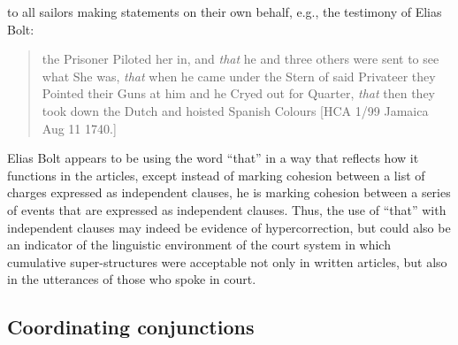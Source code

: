 to all sailors making statements on their own behalf, e.g., the testimony of Elias Bolt:

\begin{quotation}
the Prisoner Piloted her in, and \textit{that} he and three others were sent to see what She was, \textit{that} when he came under the Stern of said Privateer they Pointed their Guns at him and he Cryed out for Quarter, \textit{that} then they took down the Dutch and hoisted Spanish Colours [HCA 1/99 Jamaica Aug 11 1740.]\end{quotation}

Elias Bolt appears to be using the word “that” in a way that reflects how it functions in the articles, except instead of marking cohesion between a list of charges expressed as independent clauses, he is marking cohesion between a series of events that are expressed as independent clauses. Thus, the use of “that” with independent clauses may indeed be evidence of hypercorrection, but could also be an indicator of the linguistic environment of the court system in which cumulative super-structures were acceptable not only in written articles, but also in the utterances of those who spoke in court. 

\subsection{\textbf{Coordinating} \textbf{conjunctions} }%


